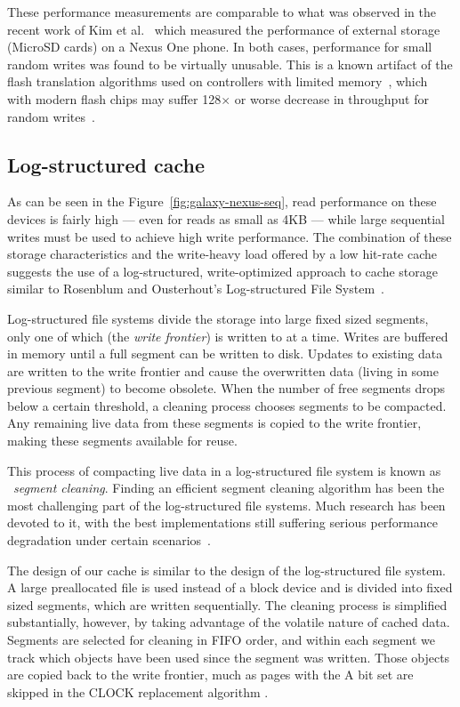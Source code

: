 \documentclass[letterpaper,twocolumn,10pt]{article}
\begin{document}
These performance measurements are comparable to what was observed in the
recent work of Kim et al.~\cite{kim12} which measured the performance of
external storage (MicroSD cards) on a Nexus One
phone.  In both cases, performance for small random writes was found
to be virtually unusable.  This is a known artifact of the flash translation
algorithms used on controllers with limited memory~\cite{Kim2002:FTL}, which
with modern flash chips may suffer 128$\times$ or worse decrease in throughput for
random writes~\cite{boboila_performance_2011}.

\subsection{Log-structured cache}
As can be seen in the Figure~\ref{fig:galaxy-nexus-seq}, read performance on
these devices is fairly high --- even for reads as small as 4KB --- while large
sequential writes must be used to achieve high write performance.
The combination of these storage characteristics and the write-heavy load
offered by a low hit-rate cache suggests the use of a log-structured,
write-optimized approach to cache storage similar to Rosenblum and Ousterhout's
Log-structured File System~\cite{rosenblum92}.

Log-structured file systems divide the storage into large fixed sized segments,
only one of which (the \emph{write frontier}) is written to at a time.  Writes
are buffered in memory until a full segment can be written to disk.  Updates to
existing data are written to the write frontier and cause the overwritten data
(living in some previous segment) to become obsolete.  When the number of free
segments drops below a certain threshold, a cleaning process chooses segments to
be compacted.  Any remaining live data from these segments is copied to the
write frontier, making these segments available for reuse.

This process of compacting live data in a log-structured file system is known as
~\emph{segment cleaning}.  Finding an efficient segment cleaning algorithm has
been the most challenging part of the log-structured file systems.  Much
research has been devoted to it, with the best implementations still suffering serious
performance degradation under certain scenarios~\cite{seltzer93}.

The design of our cache is similar to the design of the log-structured file
system.  A large preallocated file is used instead of a block device and is
divided into fixed sized segments, which are written sequentially. The
cleaning process is simplified substantially, however, by taking
advantage of the volatile nature of cached data. Segments are selected
for cleaning in FIFO order, and within each segment we track which
objects have been used since the segment was written. Those objects
are copied back to the write frontier, much as pages with the A bit
set are skipped in the CLOCK replacement algorithm \cite{corbato_paging_1969}.
\end{document}
